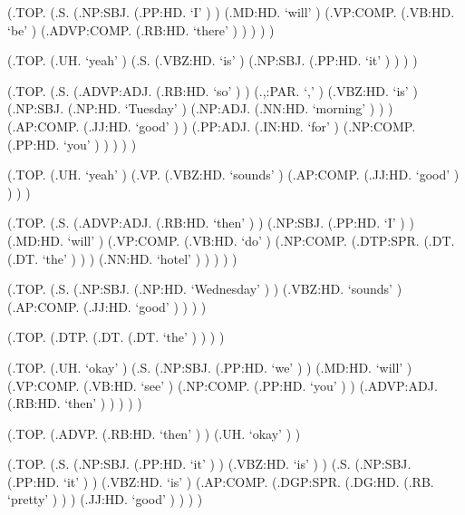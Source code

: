 \documentclass[10pt]{article}
\begin{document}
\begin{parsetree}  (.TOP. (.S. (.NP:SBJ. (.PP:HD. `I' ) ) (.MD:HD. `will' ) (.VP:COMP. (.VB:HD. `be' ) (.ADVP:COMP. (.RB:HD. `there' ) ) ) ) ) \end{parsetree}

\begin{parsetree}  (.TOP. (.UH. `yeah' ) (.S. (.VBZ:HD. `is' ) (.NP:SBJ. (.PP:HD. `it' ) ) ) ) \end{parsetree}

\begin{parsetree}  (.TOP. (.S. (.ADVP:ADJ. (.RB:HD. `so' ) ) (.,:PAR. `,' ) (.VBZ:HD. `is' ) (.NP:SBJ. (.NP:HD. `Tuesday' ) (.NP:ADJ. (.NN:HD. `morning' ) ) ) (.AP:COMP. (.JJ:HD. `good' ) ) (.PP:ADJ. (.IN:HD. `for' ) (.NP:COMP. (.PP:HD. `you' ) ) ) ) ) \end{parsetree}

\begin{parsetree}  (.TOP. (.UH. `yeah' ) (.VP. (.VBZ:HD. `sounds' ) (.AP:COMP. (.JJ:HD. `good' ) ) ) ) \end{parsetree}

\begin{parsetree}  (.TOP. (.S. (.ADVP:ADJ. (.RB:HD. `then' ) ) (.NP:SBJ. (.PP:HD. `I' ) ) (.MD:HD. `will' ) (.VP:COMP. (.VB:HD. `do' ) (.NP:COMP. (.DTP:SPR. (.DT. (.DT. `the' ) ) ) (.NN:HD. `hotel' ) ) ) ) ) \end{parsetree}

\begin{parsetree}  (.TOP. (.S. (.NP:SBJ. (.NP:HD. `Wednesday' ) ) (.VBZ:HD. `sounds' ) (.AP:COMP. (.JJ:HD. `good' ) ) ) ) \end{parsetree}

\begin{parsetree}  (.TOP. (.DTP. (.DT. (.DT. `the' ) ) ) ) \end{parsetree}

\begin{parsetree}  (.TOP. (.UH. `okay' ) (.S. (.NP:SBJ. (.PP:HD. `we' ) ) (.MD:HD. `will' ) (.VP:COMP. (.VB:HD. `see' ) (.NP:COMP. (.PP:HD. `you' ) ) (.ADVP:ADJ. (.RB:HD. `then' ) ) ) ) ) \end{parsetree}

\begin{parsetree}  (.TOP. (.ADVP. (.RB:HD. `then' ) ) (.UH. `okay' ) ) \end{parsetree}

\begin{parsetree}  (.TOP. (.S. (.NP:SBJ. (.PP:HD. `it' ) ) (.VBZ:HD. `is' ) ) (.S. (.NP:SBJ. (.PP:HD. `it' ) ) (.VBZ:HD. `is' ) (.AP:COMP. (.DGP:SPR. (.DG:HD. (.RB. `pretty' ) ) ) (.JJ:HD. `good' ) ) ) ) \end{parsetree}
\end{document}
